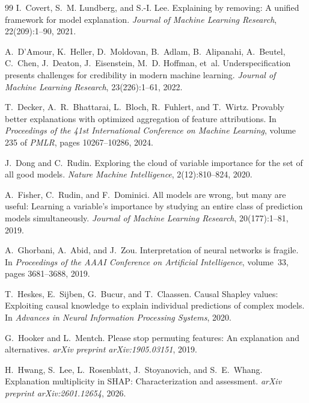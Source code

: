 \documentclass[10pt]{article}
\begin{document}
\begin{thebibliography}{99}
I.~Covert, S.~M. Lundberg, and S.-I. Lee.
\newblock Explaining by removing: A unified framework for model explanation.
\newblock \emph{Journal of Machine Learning Research}, 22(209):1--90, 2021.

A.~D'Amour, K.~Heller, D.~Moldovan, B.~Adlam, B.~Alipanahi, A.~Beutel,
  C.~Chen, J.~Deaton, J.~Eisenstein, M.~D. Hoffman, et~al.
\newblock Underspecification presents challenges for credibility in modern
  machine learning.
\newblock \emph{Journal of Machine Learning Research}, 23(226):1--61, 2022.

T.~Decker, A.~R.~Bhattarai, L.~Bloch, R.~Fuhlert, and T.~Wirtz.
\newblock Provably better explanations with optimized aggregation of feature
  attributions.
\newblock In \emph{Proceedings of the 41st International Conference on Machine
  Learning}, volume 235 of \emph{PMLR}, pages 10267--10286, 2024.

J.~Dong and C.~Rudin.
\newblock Exploring the cloud of variable importance for the set of all good
  models.
\newblock \emph{Nature Machine Intelligence}, 2(12):810--824, 2020.

A.~Fisher, C.~Rudin, and F.~Dominici.
\newblock All models are wrong, but many are useful: Learning a variable's
  importance by studying an entire class of prediction models simultaneously.
\newblock \emph{Journal of Machine Learning Research}, 20(177):1--81, 2019.

A.~Ghorbani, A.~Abid, and J.~Zou.
\newblock Interpretation of neural networks is fragile.
\newblock In \emph{Proceedings of the AAAI Conference on Artificial
  Intelligence}, volume~33, pages 3681--3688, 2019.

T.~Heskes, E.~Sijben, G.~Bucur, and T.~Claassen.
\newblock Causal {S}hapley values: Exploiting causal knowledge to explain
  individual predictions of complex models.
\newblock In \emph{Advances in Neural Information Processing Systems}, 2020.

G.~Hooker and L.~Mentch.
\newblock Please stop permuting features: An explanation and alternatives.
\newblock \emph{arXiv preprint arXiv:1905.03151}, 2019.

H.~Hwang, S.~Lee, L.~Rosenblatt, J.~Stoyanovich, and S.~E.~Whang.
\newblock Explanation multiplicity in {SHAP}: Characterization and assessment.
\newblock \emph{arXiv preprint arXiv:2601.12654}, 2026.


\end{thebibliography}
\end{document}
